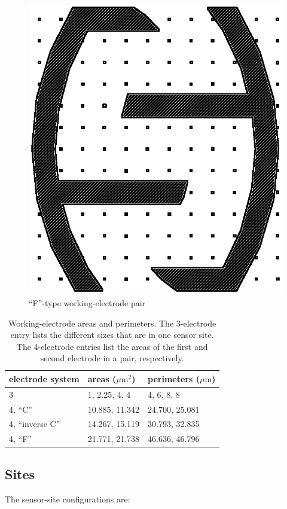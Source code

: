 \begin{figure}
	\centering
	\includegraphics[width=0.1\linewidth]{figures/4-F.png}
	\caption{``F''-type working-electrode pair}
	\label{4-F}
\end{figure}

\begin{table}
	\begin{tabular}{l|l|l}
		\textbf{electrode system} & \textbf{areas} ($\mu \mathrm{m}^2$) & \textbf{perimeters} ($\mu \mathrm{m}$) \\
		\hline
		3 & 1, 2.25, 4, 4 & 4, 6, 8, 8 \\
		4, ``C'' & 10.885, 11.342 & 24.700, 25.081 \\
		4, ``inverse C'' & 14.267, 15.119 & 30.793, 32.835 \\
		4, ``F'' & 21.771, 21.738 & 46.636, 46.796
	\end{tabular}
	\caption[Working-electrode areas and perimeters]{Working-electrode areas and perimeters. The 3-electrode entry lists the different sizes that are in one sensor site. The 4-electrode entries list the areas of the first and second electrode in a pair, respectively.}
	\label{WE-size}
\end{table}

\subsection{Sites}

The sensor-site configurations are:

